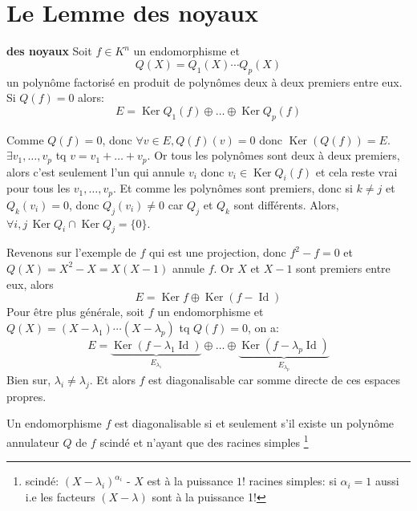 \section{Le Lemme des noyaux}
\begin{lemma}\label{lemma:lemme-des-noyaux} \textbf{des noyaux}
   Soit $f \in K^n$ un endomorphisme et 
   \[
   Q(X) = Q_1(X) \cdots Q_p(X)
   \] 
   un polynôme factorisé en produit de polynômes deux à deux premiers entre eux. Si $Q(f) = 0$ alors:
    \[
        E = \operatorname{Ker} Q_1(f) \oplus \ldots \oplus \operatorname{Ker} Q_p(f)
   \] 
\end{lemma}
\begin{intuition}
    Comme $Q(f) = 0$, donc  $\forall v \in E, Q(f)(v) = 0$ donc
    $\operatorname{Ker}(Q(f)) = E$. $\exists v_1, \ldots, v_p$ tq $v = v_1 +
    \ldots + v_p$. Or tous les polynômes sont deux à deux premiers, alors c'est
    seulement l'un qui annule $v_i$ donc  $v_i \in \operatorname{Ker}Q_i(f)$ et
    cela reste vrai pour tous les $v_1, \ldots, v_p$. Et comme les polynômes
    sont premiers, donc si $k \neq j$ et $Q_k(v_i) = 0$, donc  $Q_j(v_i) \neq
    0$ car $Q_j$ et  $Q_k$ sont différents. Alors,  $\forall i, j \,
    \operatorname{Ker}Q_i \cap \operatorname{Ker}Q_j = \{0\}$.
\end{intuition}
\begin{remark}
   Revenons sur l'exemple de $f$ qui est une projection, donc  $f^2 - f = 0$ et  $Q(X) = X^2 - X = X(X-1)$ annule $f$. Or  $X$ et  $X-1$ sont premiers entre eux, alors 
    \[
        E = \operatorname{Ker}f \oplus \operatorname{Ker}(f - \operatorname{Id})
   \] 
    Pour être plus générale, soit $f$ un endomorphisme et $Q(X) = (X - \lambda_1) \cdots (X - \lambda_p)$ tq $Q(f) = 0$, on a:
     \[
         E = \underbrace{\operatorname{Ker}(f - \lambda_1 \operatorname{Id})}_{E_{\lambda_1}} \oplus \ldots \oplus \underbrace{\operatorname{Ker}(f - \lambda_p \operatorname{Id})}_{E_{\lambda_p}}
    \] 
    Bien sur, $\lambda_i \neq \lambda_j$. Et alors $f$ est diagonalisable car somme directe de ces espaces propres.
\end{remark}
\begin{corollary}
    Un endomorphisme $f$ est diagonalisable si et seulement s'il existe un polynôme annulateur  $Q$ de  $f$ scindé et n'ayant que des racines simples \footnote{scindé: $(X - \lambda_i)^{\alpha_i}$ - $X$ est à la puissance  $1$! racines simples: si  $\alpha_i = 1$ aussi i.e les facteurs  $(X - \lambda)$ sont à la puissance 1!} 
\end{corollary}

